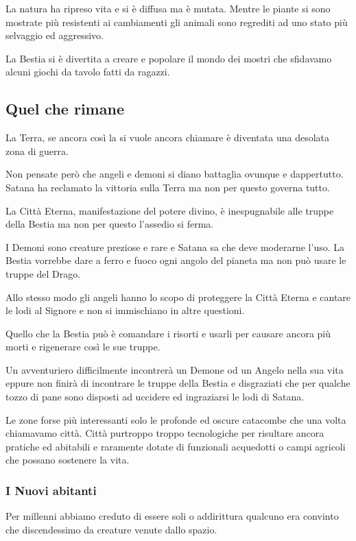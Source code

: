 \documentclass[12pt,a4paper,twoside,openany]{book}
\begin{document}
\begin{multicols}{2}
La natura ha ripreso vita e si è diffusa ma è mutata. Mentre le piante si sono mostrate più resistenti ai cambiamenti gli animali sono regrediti ad uno stato più selvaggio ed aggressivo.

La Bestia si è divertita a creare e popolare il mondo dei mostri che sfidavamo alcuni giochi da tavolo fatti da ragazzi.

\subsection{Quel che rimane}

La Terra, se ancora così la si vuole ancora chiamare è diventata una desolata zona di guerra.

Non pensate però che angeli e demoni si diano battaglia ovunque e dappertutto. Satana ha reclamato la vittoria sulla Terra ma non per questo governa tutto.

La Città Eterna, manifestazione del potere divino, è inespugnabile alle truppe della Bestia ma non per questo l'assedio si ferma.

I Demoni sono creature preziose e rare e Satana sa che deve moderarne l'uso. La Bestia vorrebbe dare a ferro e fuoco ogni angolo del pianeta ma non può usare le truppe del Drago.

Allo stesso modo gli angeli hanno lo scopo di proteggere la Città Eterna e cantare le lodi al Signore e non si immischiano in altre questioni.

Quello che la Bestia può è comandare i risorti e usarli per causare ancora più morti e rigenerare così le sue truppe.

Un avventuriero difficilmente incontrerà un Demone od un Angelo nella sua vita eppure non finirà di incontrare le truppe della Bestia e disgraziati che per qualche tozzo di pane sono disposti ad uccidere ed ingraziarsi le lodi di Satana.

Le zone forse più interessanti solo le profonde ed oscure catacombe che una volta chiamavamo città.
Città purtroppo troppo tecnologiche per risultare ancora pratiche ed abitabili e raramente dotate di funzionali acquedotti o campi agricoli che possano sostenere la vita.

\subsubsection{I Nuovi abitanti}

Per millenni abbiamo creduto di essere soli o addirittura qualcuno era convinto che discendessimo da creature venute dallo spazio.


\end{multicols}
\end{document}
